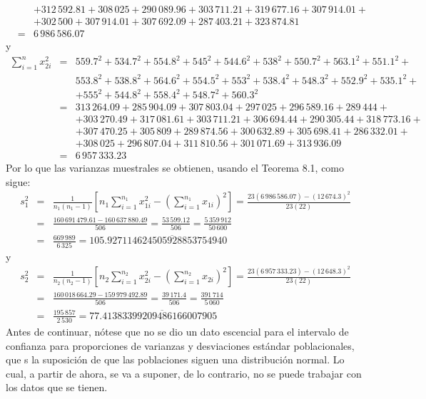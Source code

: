 \begin{solucion}
\begin{eqnarray*}
  & & + 312\,592.81 + 308\,025 + 290\,089.96 + 303\,711.21 + 319\,677.16 + 307\,914.01 + \\
  & & + 302\,500 + 307\,914.01 + 307\,692.09 + 287\,403.21 + 323\,874.81 \\
  & = & 6\,986\,586.07
 \end{eqnarray*}
 y
 \begin{eqnarray*}
  \sum_{i=1}^{n} x_{2i}^2 & = & 559.7^2 + 534.7^2 + 554.8^2 + 545^2 + 544.6^2 + 538^2 + 550.7^2 + 563.1^2 + 551.1^2 + \\
  & & 553.8^2 + 538.8^2 + 564.6^2 + 554.5^2 + 553^2 + 538.4^2 + 548.3^2 + 552.9^2 + 535.1^2 + \\
  & & + 555^2 + 544.8^2 + 558.4^2 + 548.7^2 + 560.3^2 \\
  & = & 313\,264.09 + 285\,904.09 + 307\,803.04 + 297\,025 + 296\,589.16 + 289\,444 + \\
  & & + 303\,270.49 + 317\,081.61 + 303\,711.21 + 306\,694.44 + 290\,305.44 + 318\,773.16 + \\
  & & + 307\,470.25 + 305\,809 + 289\,874.56 + 300\,632.89 + 305\,698.41 + 286\,332.01 + \\
  & & + 308\,025 + 296\,807.04 + 311\,810.56 + 301\,071.69 + 313\,936.09 \\
  & = & 6\,957\,333.23
 \end{eqnarray*}
 Por lo que las varianzas muestrales se obtienen, usando el Teorema 8.1, como sigue:
 \begin{eqnarray*}
  s_1^2 & = & \frac{1}{n_1(n_1-1)} \left[ n_1 \sum_{i=1}^{n_1} x_{1i}^2 - \left( \sum_{i=1}^{n_1} x_{1i} \right)^2 \right] = \frac{23(6\,986\,586.07) - (12\,674.3)^2}{23(22)} \\
  & = & \frac{160\,691\,479.61 - 160\,637\,880.49}{506} = \frac{53\,599.12}{506} = \frac{5\,359\,912}{50\,600} \\
  & = & \frac{669\,989}{6\,325} = 105.92\overline{7114624505928853754940}
 \end{eqnarray*}
 y
 \begin{eqnarray*}
  s_2^2 & = & \frac{1}{n_2(n_2-1)} \left[ n_2 \sum_{i=1}^{n_2} x_{2i}^2 - \left( \sum_{i=1}^{n_2} x_{2i} \right)^2 \right] = \frac{23(6\,957\,333.23) - (12\,648.3)^2}{23(22)} \\
  & = & \frac{160\,018\,664.29 - 159\,979\,492.89}{506} = \frac{39\,171.4}{506} = \frac{391\,714}{5\,060} \\
  & = & \frac{195\,857}{2\,530} = 77.4\overline{1383399209486166007905}
 \end{eqnarray*}
 Antes de continuar, n\'otese que no se dio un dato escencial para el intervalo de confianza para proporciones de varianzas y desviaciones est\'andar poblacionales, que s la suposici\'on de que las poblaciones siguen una distribuci\'on normal. Lo cual, a partir de ahora, se va a suponer, de lo contrario, no se puede trabajar con los datos que se tienen.

\end{solucion}
